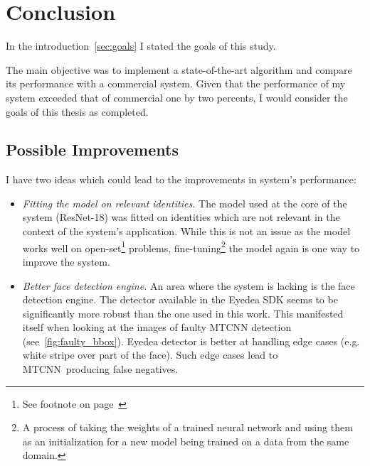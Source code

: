 \chapter{Conclusion}\label{ch:conclusion}
In the introduction~\ref{sec:goals} I stated the goals of this study.

The main objective was to implement a state-of-the-art algorithm and compare its performance with a commercial system.
Given that the performance of my system exceeded that of commercial one by two percents, I would consider the goals
of this thesis as completed.

\section{Possible Improvements}\label{sec:possible-improvements}
I have two ideas which could lead to the improvements in system's performance:
\begin{itemize}
    \item \textit{Fitting the model on relevant identities.} The model used at the core of the system (ResNet-18) was
    fitted on identities which are not relevant in the context of the system's application.
    While this is not an issue as the model works well on open-set\footnote{See footnote on page~\pageref{foot:openset}}
    problems, fine-tuning\footnote{A process of taking the weights of a trained neural network and using them as
    an initialization for a new model being trained on a data from the same domain.} the model again is one way to
    improve the system.
    \item \textit{Better face detection engine.} An area where the system is lacking is the face detection engine.
    The detector available in the Eyedea SDK seems to be significantly more robust than the one used in this work.
    This manifested itself when looking at the images of faulty MTCNN detection (see~\ref{fig:faulty_bbox}).
    Eyedea detector is better at handling edge cases (e.g. white stripe over part of the face).
    Such edge cases lead to MTCNN producing false negatives.
\end{itemize}